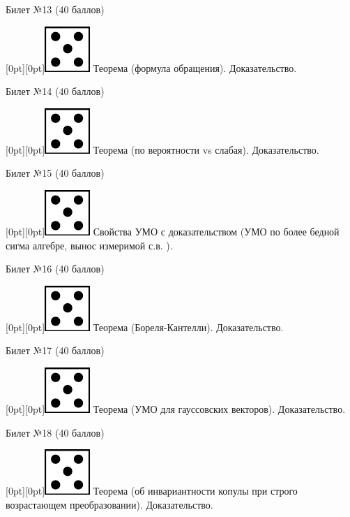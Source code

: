 \documentclass[10pt]{article}
\begin{document}
\begin{center} {\Large Билет №13 (40 баллов)} \end{center}
\raisebox{-1pt}[0pt][0pt]{\includegraphics[width=0.02\linewidth]{5.png}} Теорема (формула обращения). Доказательство. \\
\begin{center} {\Large Билет №14 (40 баллов)} \end{center}
\raisebox{-1pt}[0pt][0pt]{\includegraphics[width=0.02\linewidth]{5.png}} Теорема (по вероятности vs слабая). Доказательство. \\  
\begin{center} {\Large Билет №15 (40 баллов)} \end{center}
\raisebox{-1pt}[0pt][0pt]{\includegraphics[width=0.02\linewidth]{5.png}} Свойства УМО с доказательством (УМО по более бедной сигма алгебре, вынос измеримой с.в. ). \\
\begin{center} {\Large Билет №16 (40 баллов)} \end{center}
\raisebox{-1pt}[0pt][0pt]{\includegraphics[width=0.02\linewidth]{5.png}} Теорема (Бореля-Кантелли). Доказательство. \\
\begin{center} {\Large Билет №17 (40 баллов)} \end{center}
\raisebox{-1pt}[0pt][0pt]{\includegraphics[width=0.02\linewidth]{5.png}} Теорема (УМО для гауссовских векторов). Доказательство. \\
\begin{center} {\Large Билет №18 (40 баллов)} \end{center}
\raisebox{-1pt}[0pt][0pt]{\includegraphics[width=0.02\linewidth]{5.png}} Теорема (об инвариантности копулы при строго возрастающем преобразовании). Доказательство. \\
\end{document}
